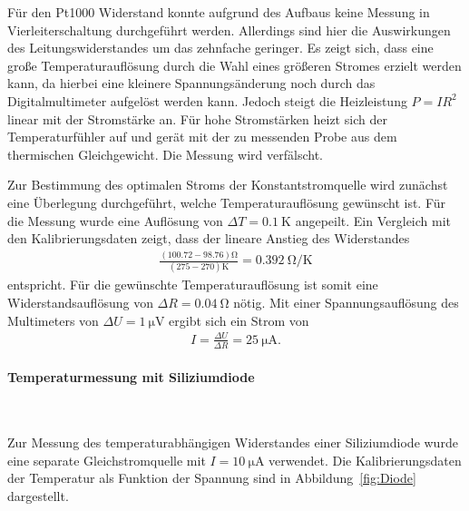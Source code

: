 \documentclass[parskip=half, a4paper,twoside,final]{article}
\begin{document}


Für den Pt1000 Widerstand konnte aufgrund des Aufbaus keine Messung in Vierleiterschaltung durchgeführt werden. Allerdings sind hier die Auswirkungen des Leitungswiderstandes um das zehnfache geringer. Es zeigt sich, dass eine große Temperaturauflösung durch die Wahl eines größeren Stromes erzielt werden kann, da hierbei eine kleinere Spannungsänderung noch durch das Digitalmultimeter aufgelöst werden kann. Jedoch steigt die Heizleistung $P = I R^2$ linear mit der Stromstärke an. Für hohe Stromstärken heizt sich der Temperaturfühler auf und gerät mit der zu messenden Probe aus dem thermischen Gleichgewicht. Die Messung wird verfälscht.

Zur Bestimmung des optimalen Stroms der Konstantstromquelle wird zunächst eine Überlegung durchgeführt, welche Temperaturauflösung gewünscht ist. Für die Messung wurde eine Auflösung von $\Delta T = \SI{0.1}{\kelvin}$ angepeilt. Ein Vergleich mit den Kalibrierungsdaten zeigt, dass der lineare Anstieg des Widerstandes
\begin{align}
  \frac{(100.72-98.76)\si{\ohm}}{(275-270)\si{\kelvin}} = \SI{0.392}{\ohm\per\kelvin}
\end{align}
entspricht. Für die gewünschte Temperaturauflösung ist somit eine Widerstandsauflösung von $\Delta R = \SI{0.04}{\ohm}$ nötig. Mit einer Spannungsauflösung des Multimeters von $\Delta U = \SI{1}{\micro\volt}$ ergibt sich ein Strom von
\begin{align}
  I = \frac{\Delta U}{\Delta R} = \SI{25}{\micro\ampere}.
\end{align}

\paragraph{Temperaturmessung mit Siliziumdiode}$~$

Zur Messung des temperaturabhängigen Widerstandes einer Siliziumdiode wurde eine separate Gleichstromquelle mit $I = \SI{10}{\micro\ampere}$ verwendet. Die Kalibrierungsdaten der Temperatur als Funktion der Spannung sind in Abbildung~\ref{fig:Diode} dargestellt.


\end{document}
